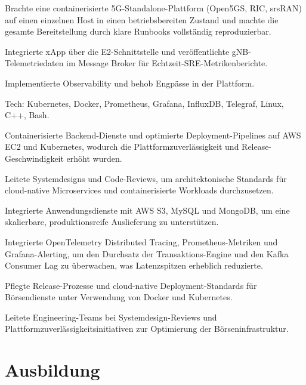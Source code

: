 \documentclass[10pt,a4paper]{resume}
\begin{document}
\bullets
  \item Brachte eine containerisierte 5G-Standalone-Plattform (Open5GS, RIC, srsRAN) auf einen einzelnen Host in einen betriebsbereiten Zustand und machte die gesamte Bereitstellung durch klare Runbooks vollständig reproduzierbar.
  \item Integrierte xApp über die E2-Schnittstelle und veröffentlichte gNB-Telemetriedaten im Message Broker für Echtzeit-SRE-Metrikenberichte.
  \item Implementierte Observability und behob Engpässe in der Plattform.
  \item Tech: Kubernetes, Docker, Prometheus, Grafana, InfluxDB, Telegraf, Linux, C++, Bash.
\bulletsend
\vspace{1.5pt}
\bullets
  \item Containerisierte Backend-Dienste und optimierte Deployment-Pipelines auf AWS EC2 und Kubernetes, wodurch die Plattformzuverlässigkeit und Release-Geschwindigkeit erhöht wurden.
  \item Leitete Systemdesigns und Code-Reviews, um architektonische Standards für cloud-native Microservices und containerisierte Workloads durchzusetzen.
  \item Integrierte Anwendungsdienste mit AWS S3, MySQL und MongoDB, um eine skalierbare, produktionsreife Auslieferung zu unterstützen.
\bulletsend
\vspace{1.5pt}
\bullets
  \item Integrierte OpenTelemetry Distributed Tracing, Prometheus-Metriken und Grafana-Alerting, um den Durchsatz der Transaktions-Engine und den Kafka Consumer Lag zu überwachen, was Latenzspitzen erheblich reduzierte.
  \item Pflegte Release-Prozesse und cloud-native Deployment-Standards für Börsendienste unter Verwendung von Docker und Kubernetes.
  \item Leitete Engineering-Teams bei Systemdesign-Reviews und Plattformzuverlässigkeitsinitiativen zur Optimierung der Börseninfrastruktur.
\bulletsend
\vspace{1.5pt}

\section{Ausbildung}
\end{document}
